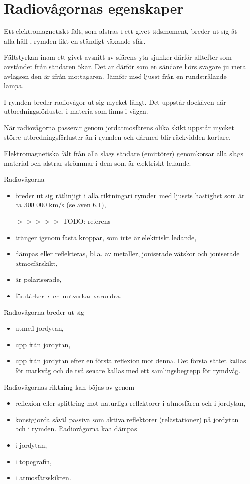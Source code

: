 \section{Radiovågornas egenskaper}
\label{radiovågornasegenskaper}

Ett elektromagnetiskt fält, som alstras i ett givet tidsmoment, breder
ut sig åt alla håll i rymden likt en ständigt växande sfär.

Fältstyrkan inom ett givet avsnitt av sfärens yta sjunker därför
alltefter som avståndet från sändaren ökar. Det är därför som en
sändare hörs svagare ju mera avlägsen den är ifrån mottagaren. Jämför
med ljuset från en rundstrålande lampa.

I rymden breder radiovågor ut sig mycket långt. Det uppstår dockäven
där utbredningsförluster i materia som finns i vägen.

När radiovågorna passerar genom jordatmosfärens olika skikt uppstår
mycket större utbredningsförluster än i rymden och därmed blir
räckvidden kortare.

Elektromagnetiska fält från alla slags sändare (emittörer) genomkorsar
alla slags material och alstrar strömmar i dem som är elektriskt
ledande.

Radiovågorna
\begin{itemize}
\item breder ut sig rätlinjigt i alla riktningari rymden med ljusets
  hastighet som är ca 300 000 km/s (se även 6.1),

$>>>>>$ TODO: referens

\item tränger igenom fasta kroppar, som inte är elektriskt ledande,
\item dämpas eller reflekteras, bl.a. av metaller, joniserade vätskor
  och joniserade atmosfärskikt,
\item är polariserade,
\item förstärker eller motverkar varandra.
\end{itemize}
Radiovågorna breder ut sig
\begin{itemize}
\item utmed jordytan,
\item upp från jordytan,
\item upp från jordytan efter en första reflexion mot denna.  Det
  första sättet kallas för markvåg och de två senare kallas med ett
  samlingsbegrepp för rymdvåg.
\end{itemize}

Radiovågornas riktning kan böjas av genom
\begin{itemize}
\item reflexion eller splittring mot naturliga reflektorer i
  atmosfären och i jordytan,
\item konstgjorda såväl passiva som aktiva reflektorer (relästationer)
  på jordytan och i rymden.  Radiovågorna kan dämpas
\item i jordytan,
\item i topografin,
\item i atmosfärsskikten.
\end{itemize}


